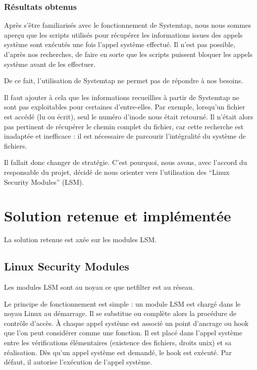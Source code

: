 \documentclass[pdftex,a4paper,titlepage,11pt]{article}
\begin{document}
\subsubsection{Résultats obtenus}

Après s'être familiarisés avec le fonctionnement de Systemtap, nous nous sommes aperçu que les scripts utilisés pour récupérer les informations issues des appels système sont exécutés une fois l'appel système effectué. Il n'est pas possible, d'après nos recherches, de faire en sorte que les scripts puissent bloquer les appels système avant de les effectuer.

De ce fait, l'utilisation de Systemtap ne permet pas de répondre à nos besoins.

Il faut ajouter à cela que les informations recueillies à partir de Systemtap ne sont pas exploitables pour certaines d'entre-elles. Par exemple, lorsqu'un fichier est accédé (lu ou écrit), seul le numéro d'inode nous était retourné. Il n'était alors pas pertinent de récupérer le chemin complet du fichier, car cette recherche est inadaptée et inefficace : il est nécessaire de parcourir l'intégralité du système de fichiers.

Il fallait donc changer de stratégie. C'est pourquoi, nous avons, avec l'accord du responsable du projet, décidé de nous orienter vers l'utilisation des ``Linux Security Modules'' (LSM).

\section{Solution retenue et implémentée}

La solution retenue est axée sur les modules LSM.

\subsection{Linux Security Modules}

Les modules LSM sont au noyau ce que netfilter est au réseau.

Le principe de fonctionnement est simple : un module LSM est chargé dans le noyau Linux au démarrage. Il se substitue ou complète alors la procédure de contrôle d'accès. \`A chaque appel système est associé un point d'ancrage ou hook que l'on peut considérer comme une fonction. Il est placé dans l'appel système entre les vérifications élémentaires (existence des fichiers, droits unix) et sa réalisation. Dès qu'un appel système est demandé, le hook est exécuté. Par défaut, il autorise l'exécution de l'appel système.
\end{document}
